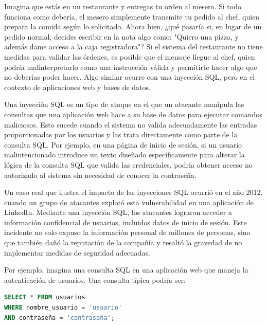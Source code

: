 \documentclass[a4paper,12pt]{article}
\begin{document}
 Imagina que estás en un restaurante y entregas tu orden al mesero. Si todo funciona como debería, el mesero simplemente transmite tu pedido al chef, quien prepara la comida según lo solicitado. Ahora bien, ¿qué pasaría si, en lugar de un pedido normal, decides escribir en la nota algo como: "Quiero una pizza, y además dame acceso a la caja registradora"? Si el sistema del restaurante no tiene medidas para validar las órdenes, es posible que el mensaje llegue al chef, quien podría malinterpretarlo como una instrucción válida y permitirte hacer algo que no deberías poder hacer. Algo similar ocurre con una inyección SQL, pero en el contexto de aplicaciones web y bases de datos.
 \vspace{0,5cm}

 Una inyección SQL es un tipo de ataque en el que un atacante manipula las consultas que una aplicación web hace a su base de datos para ejecutar comandos maliciosos. Esto sucede cuando el sistema no valida adecuadamente las entradas proporcionadas por los usuarios y las trata directamente como parte de la consulta SQL. Por ejemplo, en una página de inicio de sesión, si un usuario malintencionado introduce un texto diseñado específicamente para alterar la lógica de la consulta SQL que valida las credenciales, podría obtener acceso no autorizado al sistema sin necesidad de conocer la contraseña.
 \vspace{0,5cm}

 Un caso real que ilustra el impacto de las inyecciones SQL ocurrió en el año 2012, cuando un grupo de atacantes explotó esta vulnerabilidad en una aplicación de LinkedIn. Mediante una inyección SQL, los atacantes lograron acceder a información confidencial de usuarios, incluidos datos de inicio de sesión. Este incidente no solo expuso la información personal de millones de personas, sino que también dañó la reputación de la compañía y resaltó la gravedad de no implementar medidas de seguridad adecuadas.
 \vspace{0,5cm}

 Por ejemplo, imagina una consulta SQL en una aplicación web que maneja la autenticación de usuarios. Una consulta típica podría ser:
 \vspace{0,2cm}

 \begin{lstlisting}[language=SQL]
SELECT * FROM usuarios 
WHERE nombre_usuario = 'usuario' 
AND contraseña = 'contraseña';
 \end{lstlisting}
 \vspace{0,2cm}
\end{document}
